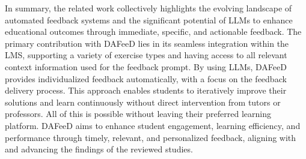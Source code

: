 \documentclass[sigconf,screen,review,anonymous]{acmart}
\begin{document}
In summary, the related work collectively highlights the evolving landscape of automated feedback systems and the significant potential of LLMs to enhance educational outcomes through immediate, specific, and actionable feedback.
The primary contribution with DAFeeD lies in its seamless integration within the LMS, supporting a variety of exercise types and having access to all relevant context information used for the feedback prompt.
By using LLMs, DAFeeD provides individualized feedback automatically, with a focus on the feedback delivery process.
This approach enables students to iteratively improve their solutions and learn continuously without direct intervention from tutors or professors.
All of this is possible without leaving their preferred learning platform.
DAFeeD aims to enhance student engagement, learning efficiency, and performance through timely, relevant, and personalized feedback, aligning with and advancing the findings of the reviewed studies.









\end{document}
